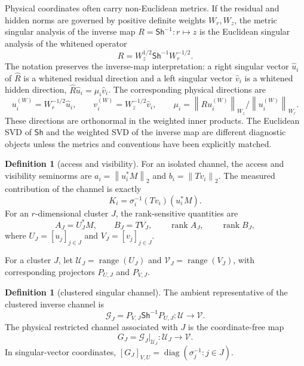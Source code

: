 \documentclass[review]{siamart220329}
\theoremstyle{definition}
\newtheorem{definition}[theorem]{Definition}
\theoremstyle{remark}
\newcommand{\calU}{\mathcal{U}}
\newcommand{\calV}{\mathcal{V}}
\newcommand{\Sh}{\mathsf{Sh}}
\newcommand{\rank}{\operatorname{rank}}
\newcommand{\range}{\operatorname{range}}
\newcommand{\diag}{\operatorname{diag}}
\newcommand{\norm}[1]{\left\lVert #1\right\rVert}
\begin{document}
Physical coordinates often carry non-Euclidean metrics. If the residual and hidden norms are governed by positive definite weights $W_r,W_z$, the metric singular analysis of the inverse map $R=\Sh^{-1}:r\mapsto z$ is the Euclidean singular analysis of the whitened operator
\begin{equation}
    \widehat R=W_z^{1/2}\Sh^{-1}W_r^{-1/2}.
    \label{eq:weighted-resolvent}
\end{equation}
The notation preserves the inverse-map interpretation: a right singular vector $\widehat u_i$ of $\widehat R$ is a whitened residual direction and a left singular vector $\widehat v_i$ is a whitened hidden direction, $\widehat R\widehat u_i=\mu_i\widehat v_i$. The corresponding physical directions are
\begin{equation}
    u_i^{(W)}=W_r^{-1/2}\widehat u_i,
    \qquad
    v_i^{(W)}=W_z^{-1/2}\widehat v_i,
    \qquad
    \mu_i=\norm{R u_i^{(W)}}_{W_z}/\norm{u_i^{(W)}}_{W_r}.
    \label{eq:weighted-physical-vectors}
\end{equation}
These directions are orthonormal in the weighted inner products. The Euclidean SVD of $\Sh$ and the weighted SVD of the inverse map are different diagnostic objects unless the metrics and conventions have been explicitly matched.

\begin{definition}[access and visibility]
For an isolated channel, the access and visibility seminorms are $a_i=\norm{u_i^*M}_2$ and $b_i=\norm{Tv_i}_2$. The measured contribution of the channel is exactly
\begin{equation}
    K_i=\sigma_i^{-1}(Tv_i)(u_i^*M).
    \label{eq:rank-one-contribution}
\end{equation}
For an $r$-dimensional cluster $J$, the rank-sensitive quantities are
\begin{equation}
    A_J=U_J^*M,
    \qquad B_J=TV_J,
    \qquad \rank A_J,
    \qquad \rank B_J,
    \label{eq:cluster-access-visibility}
\end{equation}
where $U_J=[u_j]_{j\in J}$ and $V_J=[v_j]_{j\in J}$.
\end{definition}

For a cluster $J$, let $\calU_J=\range(U_J)$ and $\calV_J=\range(V_J)$, with corresponding projectors $P_{U,J}$ and $P_{V,J}$.

\begin{definition}[clustered singular channel]
The ambient representative of the clustered inverse channel is
\begin{equation}
    \mathcal G_J=P_{V,J}\Sh^{-1}P_{U,J}:\calU\to\calV .
\end{equation}
The physical restricted channel associated with $J$ is the coordinate-free map
\begin{equation}
    G_J=\mathcal G_J|_{\calU_J}:\calU_J\to\calV .
    \label{eq:restricted-inverse}
\end{equation}
In singular-vector coordinates, $[G_J]_{V,U}=\diag(\sigma_j^{-1}:j\in J)$.
\end{definition}
\end{document}
